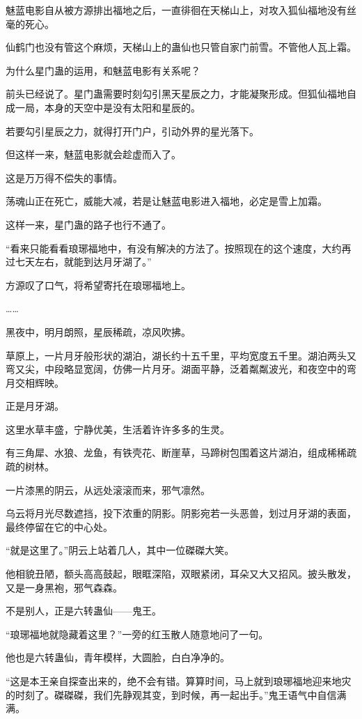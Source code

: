 \begin{this_body}
魅蓝电影自从被方源排出福地之后，一直徘徊在天梯山上，对攻入狐仙福地没有丝毫的死心。

仙鹤门也没有管这个麻烦，天梯山上的蛊仙也只管自家门前雪。不管他人瓦上霜。

为什么星门蛊的运用，和魅蓝电影有关系呢？

前头已经说了。星门蛊需要时刻勾引黑天星辰之力，才能凝聚形成。但狐仙福地自成一局，本身的天空中是没有太阳和星辰的。

若要勾引星辰之力，就得打开门户，引动外界的星光落下。

但这样一来，魅蓝电影就会趁虚而入了。

这是万万得不偿失的事情。

荡魂山正在死亡，威能大减，若是让魅蓝电影进入福地，必定是雪上加霜。

这样一来，星门蛊的路子也行不通了。

“看来只能看看琅琊福地中，有没有解决的方法了。按照现在的这个速度，大约再过七天左右，就能到达月牙湖了。”

方源叹了口气，将希望寄托在琅琊福地上。

……

黑夜中，明月朗照，星辰稀疏，凉风吹拂。

草原上，一片月牙般形状的湖泊，湖长约十五千里，平均宽度五千里。湖泊两头又弯又尖，中段略显宽阔，仿佛一片月牙。湖面平静，泛着粼粼波光，和夜空中的弯月交相辉映。

正是月牙湖。

这里水草丰盛，宁静优美，生活着许许多多的生灵。

有三角犀、水狼、龙鱼，有铁壳花、断崖草，马蹄树包围着这片湖泊，组成稀稀疏疏的树林。

一片漆黑的阴云，从远处滚滚而来，邪气凛然。

乌云将月光尽数遮挡，投下浓重的阴影。阴影宛若一头恶兽，划过月牙湖的表面，最终停留在它的中心处。

“就是这里了。”阴云上站着几人，其中一位磔磔大笑。

他相貌丑陋，额头高高鼓起，眼眶深陷，双眼紧闭，耳朵又大又招风。披头散发，又是一身黑袍，邪气森森。

不是别人，正是六转蛊仙——鬼王。

“琅琊福地就隐藏着这里？”一旁的红玉散人随意地问了一句。

他也是六转蛊仙，青年模样，大圆脸，白白净净的。

“这是本王亲自探查出来的，绝不会有错。算算时间，马上就到琅琊福地迎来地灾的时刻了。磔磔磔，我们先静观其变，到时候，再一起出手。”鬼王语气中自信满满。

\end{this_body}

